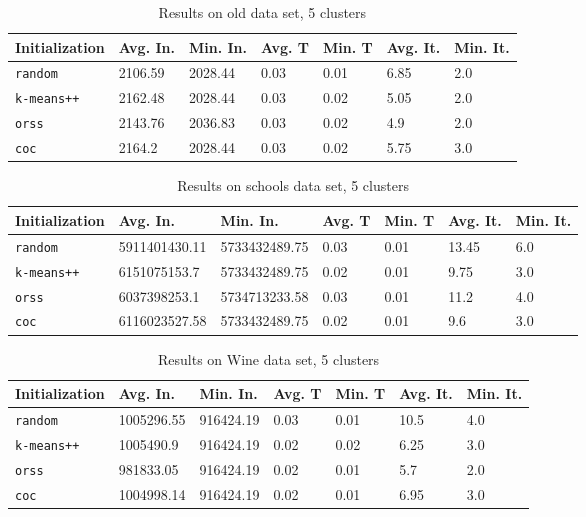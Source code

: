 \begin{table}[h]
	\begin{center}
		\begin{tabular}{|l|l|l|l|l|l|l|}
			\hline
			Initialization & Avg. In. & Min. In. & Avg. T & Min. T & Avg. It. & Min. It.\\\hline
			\texttt{random} & 2106.59 & 2028.44 & 0.03 & 0.01 & 6.85 & 2.0\\\hline
			\texttt{k-means++} & 2162.48 & 2028.44 & 0.03 & 0.02 & 5.05 & 2.0\\\hline
			\texttt{orss} & 2143.76 & 2036.83 & 0.03 & 0.02 & 4.9 & 2.0\\\hline
			\texttt{coc} & 2164.2 & 2028.44 & 0.03 & 0.02 & 5.75 & 3.0\\\hline
		\end{tabular}
		\caption{Results on old data set, 5 clusters}
		\label{tbl:old5}
	\end{center}
\end{table}

\begin{table}[h]
	\begin{center}
		\begin{tabular}{|l|l|l|l|l|l|l|}
			\hline
			Initialization & Avg. In. & Min. In. & Avg. T & Min. T & Avg. It. & Min. It.\\\hline
			\texttt{random} & 5911401430.11 & 5733432489.75 & 0.03 & 0.01 & 13.45 & 6.0\\\hline
			\texttt{k-means++} & 6151075153.7 & 5733432489.75 & 0.02 & 0.01 & 9.75 & 3.0\\\hline
			\texttt{orss} & 6037398253.1 & 5734713233.58 & 0.03 & 0.01 & 11.2 & 4.0\\\hline
			\texttt{coc} & 6116023527.58 & 5733432489.75 & 0.02 & 0.01 & 9.6 & 3.0\\\hline
		\end{tabular}
		\caption{Results on schools data set, 5 clusters}
		\label{tbl:schools5}
	\end{center}
\end{table}

\begin{table}[h]
	\begin{center}
		\begin{tabular}{|l|l|l|l|l|l|l|}
			\hline
			Initialization & Avg. In. & Min. In. & Avg. T & Min. T & Avg. It. & Min. It.\\\hline
			\texttt{random} & 1005296.55 & 916424.19 & 0.03 & 0.01 & 10.5 & 4.0\\\hline
			\texttt{k-means++} & 1005490.9 & 916424.19 & 0.02 & 0.02 & 6.25 & 3.0\\\hline
			\texttt{orss} & 981833.05 & 916424.19 & 0.02 & 0.01 & 5.7 & 2.0\\\hline
			\texttt{coc} & 1004998.14 & 916424.19 & 0.02 & 0.01 & 6.95 & 3.0\\\hline
		\end{tabular}
		\caption{Results on Wine data set, 5 clusters}
		\label{tbl:Wine5}
	\end{center}
\end{table}

